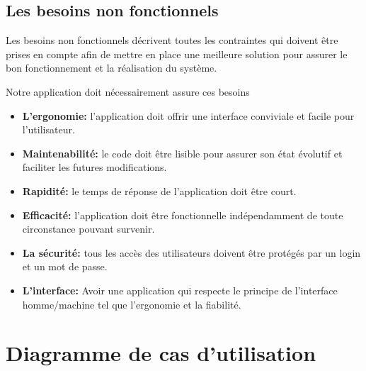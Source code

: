 \documentclass[edit,12pt,a4paper,ChapStyle,oneside,doubleinterligne]{report}
\begin{document}
\subsection{Les besoins non fonctionnels}
Les besoins non fonctionnels décrivent toutes les contraintes qui doivent être prises en compte afin de mettre en place une meilleure solution pour assurer le bon fonctionnement et la réalisation du système.

Notre application doit nécessairement assure ces besoins
\begin{itemize}
    \item \textbf{L’ergonomie: }l’application doit offrir une interface conviviale et facile pour l’utilisateur.
    \item \textbf{Maintenabilité: }le code doit être lisible pour assurer son état évolutif et faciliter les futures modifications.
    \item \textbf{Rapidité:} le temps de réponse de l’application doit être court.
    \item \textbf{Efficacité: }l’application doit être fonctionnelle indépendamment de toute circonstance pouvant survenir.
    \item \textbf{La sécurité: }tous les accès des utilisateurs doivent être protégés par un login et un mot de passe.
    \item \textbf{L’interface: }Avoir une application qui respecte le principe de \newline l'interface homme/machine tel que l'ergonomie et la fiabilité.
\end{itemize}
\section{ Diagramme de cas d'utilisation }
\end{document}
